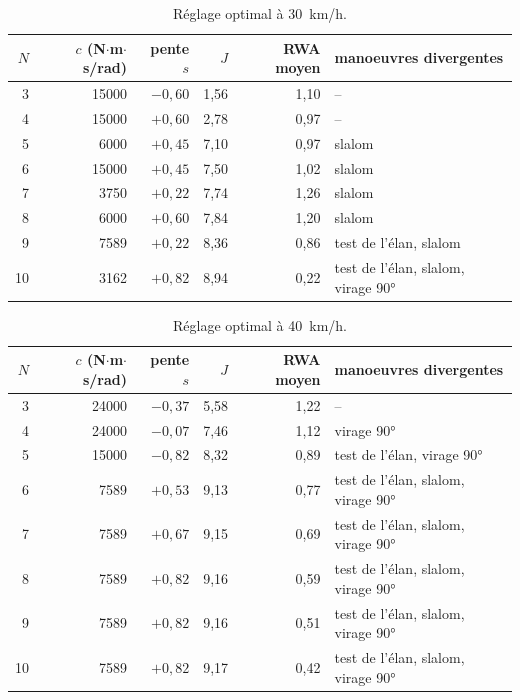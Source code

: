 \begin{table}[ht]\centering\small
\begin{tabular}{@{}r r r r r l@{}}\toprule
$N$ & $c$ (N$\cdot$m$\cdot$s/rad) & pente $s$ & $J$ & RWA moyen & manoeuvres divergentes\\\midrule
3 & 15000 & $-0{,}60$ & 1{,}56 & 1{,}10 & --\\
4 & 15000 & $+0{,}60$ & 2{,}78 & 0{,}97 & --\\
5 & 6000 & $+0{,}45$ & 7{,}10 & 0{,}97 & slalom\\
6 & 15000 & $+0{,}45$ & 7{,}50 & 1{,}02 & slalom\\
7 & 3750 & $+0{,}22$ & 7{,}74 & 1{,}26 & slalom\\
8 & 6000 & $+0{,}60$ & 7{,}84 & 1{,}20 & slalom\\
9 & 7589 & $+0{,}22$ & 8{,}36 & 0{,}86 & test de l'élan, slalom\\
10 & 3162 & $+0{,}82$ & 8{,}94 & 0{,}22 & test de l'élan, slalom, virage 90°\\
\bottomrule\end{tabular}
\caption{Réglage optimal à \SI{30}{km/h}.}\label{tab:opt30}\end{table}

\begin{table}[ht]\centering\small
\begin{tabular}{@{}r r r r r l@{}}\toprule
$N$ & $c$ (N$\cdot$m$\cdot$s/rad) & pente $s$ & $J$ & RWA moyen & manoeuvres divergentes\\\midrule
3 & 24000 & $-0{,}37$ & 5{,}58 & 1{,}22 & --\\
4 & 24000 & $-0{,}07$ & 7{,}46 & 1{,}12 & virage 90°\\
5 & 15000 & $-0{,}82$ & 8{,}32 & 0{,}89 & test de l'élan, virage 90°\\
6 & 7589 & $+0{,}53$ & 9{,}13 & 0{,}77 & test de l'élan, slalom, virage 90°\\
7 & 7589 & $+0{,}67$ & 9{,}15 & 0{,}69 & test de l'élan, slalom, virage 90°\\
8 & 7589 & $+0{,}82$ & 9{,}16 & 0{,}59 & test de l'élan, slalom, virage 90°\\
9 & 7589 & $+0{,}82$ & 9{,}16 & 0{,}51 & test de l'élan, slalom, virage 90°\\
10 & 7589 & $+0{,}82$ & 9{,}17 & 0{,}42 & test de l'élan, slalom, virage 90°\\
\bottomrule\end{tabular}
\caption{Réglage optimal à \SI{40}{km/h}.}\label{tab:opt40}\end{table}
